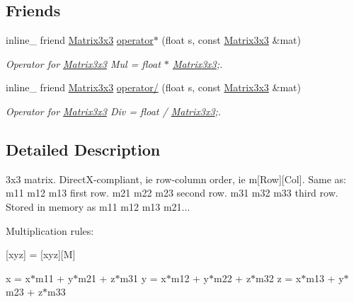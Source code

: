 \subsection*{Friends}
\begin{DoxyCompactItemize}
\item 
inline\+\_\+ friend \hyperlink{classMatrix3x3}{Matrix3x3} \hyperlink{classMatrix3x3_a54e4cff7dc37c73de3e3d0235ad36271}{operator$\ast$} (float s, const \hyperlink{classMatrix3x3}{Matrix3x3} \&mat)\hypertarget{classMatrix3x3_a54e4cff7dc37c73de3e3d0235ad36271}{}\label{classMatrix3x3_a54e4cff7dc37c73de3e3d0235ad36271}

\begin{DoxyCompactList}\small\item\em Operator for \hyperlink{classMatrix3x3}{Matrix3x3} Mul = float $\ast$ \hyperlink{classMatrix3x3}{Matrix3x3};. \end{DoxyCompactList}\item 
inline\+\_\+ friend \hyperlink{classMatrix3x3}{Matrix3x3} \hyperlink{classMatrix3x3_a639deffb8c0b2003b65c9e7ad3c5e907}{operator/} (float s, const \hyperlink{classMatrix3x3}{Matrix3x3} \&mat)\hypertarget{classMatrix3x3_a639deffb8c0b2003b65c9e7ad3c5e907}{}\label{classMatrix3x3_a639deffb8c0b2003b65c9e7ad3c5e907}

\begin{DoxyCompactList}\small\item\em Operator for \hyperlink{classMatrix3x3}{Matrix3x3} Div = float / \hyperlink{classMatrix3x3}{Matrix3x3};. \end{DoxyCompactList}\end{DoxyCompactItemize}


\subsection{Detailed Description}
3x3 matrix. Direct\+X-\/compliant, ie row-\/column order, ie m\mbox{[}Row\mbox{]}\mbox{[}Col\mbox{]}. Same as\+: m11 m12 m13 first row. m21 m22 m23 second row. m31 m32 m33 third row. Stored in memory as m11 m12 m13 m21...

Multiplication rules\+:

\mbox{[}x\textquotesingle{}y\textquotesingle{}z\textquotesingle{}\mbox{]} = \mbox{[}xyz\mbox{]}\mbox{[}M\mbox{]}

x\textquotesingle{} = x$\ast$m11 + y$\ast$m21 + z$\ast$m31 y\textquotesingle{} = x$\ast$m12 + y$\ast$m22 + z$\ast$m32 z\textquotesingle{} = x$\ast$m13 + y$\ast$m23 + z$\ast$m33

